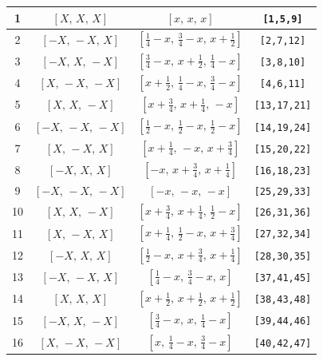 \documentclass[fleqn,8pt]{jsarticle}
\begin{document}
\begin{longtable}{cccc}
1 & $\left[ X,\, X,\, X \right]$ & $\left[ x,\, x,\, x \right]$ & {\tt [1,5,9]} \\ \hline
2 & $\left[ - X,\, - X,\, X \right]$ & $\left[ \frac{1}{4} - x,\, \frac{3}{4} - x,\, x + \frac{1}{2} \right]$ & {\tt [2,7,12]} \\ \hline
3 & $\left[ - X,\, X,\, - X \right]$ & $\left[ \frac{3}{4} - x,\, x + \frac{1}{2},\, \frac{1}{4} - x \right]$ & {\tt [3,8,10]} \\ \hline
4 & $\left[ X,\, - X,\, - X \right]$ & $\left[ x + \frac{1}{2},\, \frac{1}{4} - x,\, \frac{3}{4} - x \right]$ & {\tt [4,6,11]} \\ \hline
5 & $\left[ X,\, X,\, - X \right]$ & $\left[ x + \frac{3}{4},\, x + \frac{1}{4},\, - x \right]$ & {\tt [13,17,21]} \\ \hline
6 & $\left[ - X,\, - X,\, - X \right]$ & $\left[ \frac{1}{2} - x,\, \frac{1}{2} - x,\, \frac{1}{2} - x \right]$ & {\tt [14,19,24]} \\ \hline
7 & $\left[ X,\, - X,\, X \right]$ & $\left[ x + \frac{1}{4},\, - x,\, x + \frac{3}{4} \right]$ & {\tt [15,20,22]} \\ \hline
8 & $\left[ - X,\, X,\, X \right]$ & $\left[ - x,\, x + \frac{3}{4},\, x + \frac{1}{4} \right]$ & {\tt [16,18,23]} \\ \hline
9 & $\left[ - X,\, - X,\, - X \right]$ & $\left[ - x,\, - x,\, - x \right]$ & {\tt [25,29,33]} \\ \hline
10 & $\left[ X,\, X,\, - X \right]$ & $\left[ x + \frac{3}{4},\, x + \frac{1}{4},\, \frac{1}{2} - x \right]$ & {\tt [26,31,36]} \\ \hline
11 & $\left[ X,\, - X,\, X \right]$ & $\left[ x + \frac{1}{4},\, \frac{1}{2} - x,\, x + \frac{3}{4} \right]$ & {\tt [27,32,34]} \\ \hline
12 & $\left[ - X,\, X,\, X \right]$ & $\left[ \frac{1}{2} - x,\, x + \frac{3}{4},\, x + \frac{1}{4} \right]$ & {\tt [28,30,35]} \\ \hline
13 & $\left[ - X,\, - X,\, X \right]$ & $\left[ \frac{1}{4} - x,\, \frac{3}{4} - x,\, x \right]$ & {\tt [37,41,45]} \\ \hline
14 & $\left[ X,\, X,\, X \right]$ & $\left[ x + \frac{1}{2},\, x + \frac{1}{2},\, x + \frac{1}{2} \right]$ & {\tt [38,43,48]} \\ \hline
15 & $\left[ - X,\, X,\, - X \right]$ & $\left[ \frac{3}{4} - x,\, x,\, \frac{1}{4} - x \right]$ & {\tt [39,44,46]} \\ \hline
16 & $\left[ X,\, - X,\, - X \right]$ & $\left[ x,\, \frac{1}{4} - x,\, \frac{3}{4} - x \right]$ & {\tt [40,42,47]} \\
\end{longtable}
\end{document}
